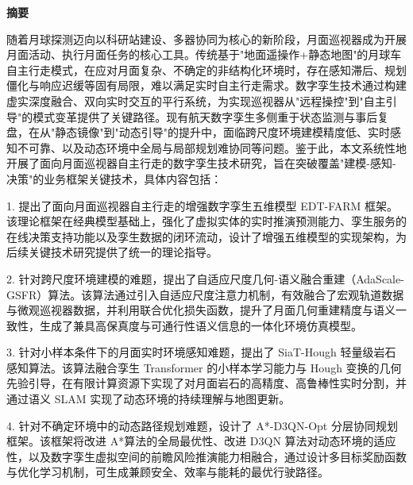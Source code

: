 \label{chapter:abstract}
\pagestyle{frontpage}


\begin{center}
\heiti\bfseries{} 摘\quad 要
\end{center}

\vspace{0.5\baselineskip}

\songti{}
\linespread{1.5}\selectfont
\setlength{\parindent}{2em}

随着月球探测迈向以科研站建设、多器协同为核心的新阶段，月面巡视器成为开展月面活动、执行月面任务的核心工具。传统基于"地面遥操作+静态地图"的月球车自主行走模式，在应对月面复杂、不确定的非结构化环境时，存在感知滞后、规划僵化与响应迟缓等固有局限，难以满足实时自主行走需求。数字孪生技术通过构建虚实深度融合、双向实时交互的平行系统，为实现巡视器从"远程操控"到"自主引导"的模式变革提供了关键路径。现有航天数字孪生多侧重于状态监测与事后复盘，在从"静态镜像"到"动态引导"的提升中，面临跨尺度环境建模精度低、实时感知不可靠、以及动态环境中全局与局部规划难协同等问题。鉴于此，本文系统性地开展了面向月面巡视器自主行走的数字孪生技术研究，旨在突破覆盖"建模-感知-决策"的业务框架关键技术，具体内容包括：

1. 提出了面向月面巡视器自主行走的增强数字孪生五维模型 EDT-FARM 框架。该理论框架在经典模型基础上，强化了虚拟实体的实时推演预测能力、孪生服务的在线决策支持功能以及孪生数据的闭环流动，设计了增强五维模型的实现架构，为后续关键技术研究提供了统一的理论指导。

2. 针对跨尺度环境建模的难题，提出了自适应尺度几何-语义融合重建（AdaScale-GSFR）算法。该算法通过引入自适应尺度注意力机制，有效融合了宏观轨道数据与微观巡视器数据，并利用联合优化损失函数，提升了月面几何重建精度与语义一致性，生成了兼具高保真度与可通行性语义信息的一体化环境仿真模型。

3. 针对小样本条件下的月面实时环境感知难题，提出了 SiaT-Hough 轻量级岩石感知算法。该算法融合孪生 Transformer 的小样本学习能力与 Hough 变换的几何先验引导，在有限计算资源下实现了对月面岩石的高精度、高鲁棒性实时分割，并通过语义 SLAM 实现了动态环境的持续理解与地图更新。

4. 针对不确定环境中的动态路径规划难题，设计了 A*-D3QN-Opt 分层协同规划框架。该框架将改进 A*算法的全局最优性、改进 D3QN 算法对动态环境的适应性，以及数字孪生虚拟空间的前瞻风险推演能力相融合，通过设计多目标奖励函数与优化学习机制，可生成兼顾安全、效率与能耗的最优行驶路径。

